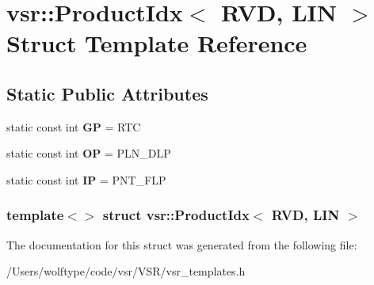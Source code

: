 \hypertarget{structvsr_1_1_product_idx_3_01_r_v_d_00_01_l_i_n_01_4}{\section{vsr\-:\-:Product\-Idx$<$ R\-V\-D, L\-I\-N $>$ Struct Template Reference}
\label{structvsr_1_1_product_idx_3_01_r_v_d_00_01_l_i_n_01_4}
}
\subsection*{Static Public Attributes}
\begin{DoxyCompactItemize}
\item 
\hypertarget{structvsr_1_1_product_idx_3_01_r_v_d_00_01_l_i_n_01_4_aaed59067879260e1929a9ae618fc402c}{static const int {\bfseries G\-P} = R\-T\-C}\label{structvsr_1_1_product_idx_3_01_r_v_d_00_01_l_i_n_01_4_aaed59067879260e1929a9ae618fc402c}

\item 
\hypertarget{structvsr_1_1_product_idx_3_01_r_v_d_00_01_l_i_n_01_4_a94e7da284b8ad5414694aa52dbea5f4d}{static const int {\bfseries O\-P} = P\-L\-N\-\_\-\-D\-L\-P}\label{structvsr_1_1_product_idx_3_01_r_v_d_00_01_l_i_n_01_4_a94e7da284b8ad5414694aa52dbea5f4d}

\item 
\hypertarget{structvsr_1_1_product_idx_3_01_r_v_d_00_01_l_i_n_01_4_a70a8f42ff885450c3b92713c8b77b22c}{static const int {\bfseries I\-P} = P\-N\-T\-\_\-\-F\-L\-P}\label{structvsr_1_1_product_idx_3_01_r_v_d_00_01_l_i_n_01_4_a70a8f42ff885450c3b92713c8b77b22c}

\end{DoxyCompactItemize}
\subsubsection*{template$<$$>$ struct vsr\-::\-Product\-Idx$<$ R\-V\-D, L\-I\-N $>$}



The documentation for this struct was generated from the following file\-:\begin{DoxyCompactItemize}
\item 
/\-Users/wolftype/code/vsr/\-V\-S\-R/vsr\-\_\-templates.\-h\end{DoxyCompactItemize}
